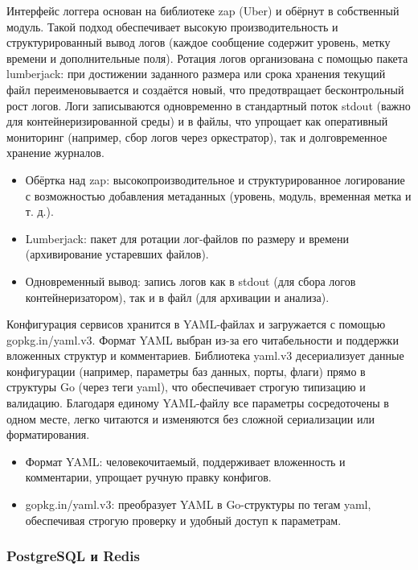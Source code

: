 Интерфейс логгера основан на библиотеке zap (Uber) и обёрнут в собственный модуль. Такой подход обеспечивает высокую производительность и структурированный вывод логов (каждое сообщение содержит уровень, метку времени и дополнительные поля). Ротация логов организована с помощью пакета lumberjack: при достижении заданного размера или срока хранения текущий файл переименовывается и создаётся новый, что предотвращает бесконтрольный рост логов. Логи записываются одновременно в стандартный поток stdout (важно для контейнеризированной среды) и в файлы, что упрощает как оперативный мониторинг (например, сбор логов через оркестратор), так и долговременное хранение журналов.

\begin{itemize}
    \item Обёртка над zap: высокопроизводительное и структурированное логирование с возможностью добавления метаданных (уровень, модуль, временная метка и т. д.).
    \item Lumberjack: пакет для ротации лог-файлов по размеру и времени (архивирование устаревших файлов).
    \item Одновременный вывод: запись логов как в stdout (для сбора логов контейнеризатором), так и в файл (для архивации и анализа).
\end{itemize}

Конфигурация сервисов хранится в YAML-файлах и загружается с помощью gopkg.in/yaml.v3. Формат YAML выбран из-за его читабельности и поддержки вложенных структур и комментариев. Библиотека yaml.v3 десериализует данные конфигурации (например, параметры баз данных, порты, флаги) прямо в структуры Go (через теги yaml), что обеспечивает строгую типизацию и валидацию. Благодаря единому YAML-файлу все параметры сосредоточены в одном месте, легко читаются и изменяются без сложной сериализации или форматирования.

\begin{itemize}
    \item Формат YAML: человекочитаемый, поддерживает вложенность и комментарии, упрощает ручную правку конфигов.
    \item gopkg.in/yaml.v3: преобразует YAML в Go-структуры по тегам yaml, обеспечивая строгую проверку и удобный доступ к параметрам.
\end{itemize}

\subsubsection*{PostgreSQL и Redis}

